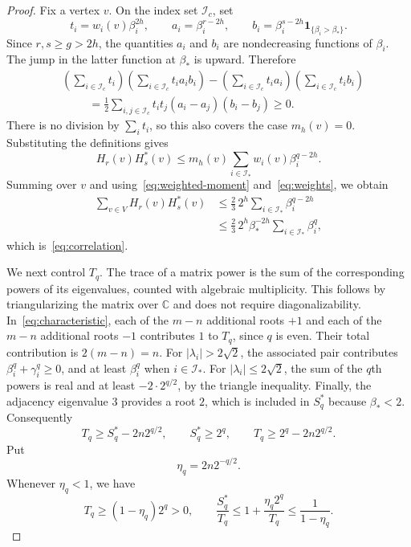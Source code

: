 \documentclass[11pt,a4paper]{article}
\newcommand{\ind}{\mathbf{1}}
\newcommand{\Ic}{\mathcal I_c}
\newcommand{\Is}{\mathcal I_*}
\begin{document}
\begin{proof}
Fix a vertex $v$. On the index set $\Ic$, set
\[
 t_i=w_i(v)\beta_i^{2h},\qquad
 a_i=\beta_i^{r-2h},\qquad
 b_i=\beta_i^{s-2h}\ind_{\{\beta_i>\beta_*\}}.
\]
Since $r,s\ge g>2h$, the quantities $a_i$ and $b_i$ are nondecreasing
functions of $\beta_i$. The jump in the latter function at $\beta_*$
is upward. Therefore
\begin{align*}
 &\left(\sum_{i\in\Ic}t_i\right)
  \left(\sum_{i\in\Ic}t_i a_i b_i\right)
 -\left(\sum_{i\in\Ic}t_i a_i\right)
  \left(\sum_{i\in\Ic}t_i b_i\right)\\
 &\hspace{1cm}
 =\frac12\sum_{i,j\in\Ic}t_it_j(a_i-a_j)(b_i-b_j)
 \ge0.
\end{align*}
There is no division by $\sum_i t_i$, so this also covers the case
$m_h(v)=0$. Substituting the definitions gives
\[
 H_r(v)H_s^*(v)
 \le m_h(v)\sum_{i\in\Is}w_i(v)\beta_i^{q-2h}.
\]
Summing over $v$ and using~\eqref{eq:weighted-moment}
and~\eqref{eq:weights}, we obtain
\begin{align*}
 \sum_{v\in V}H_r(v)H_s^*(v)
 &\le\frac23\,2^h\sum_{i\in\Is}\beta_i^{q-2h}\\
 &\le\frac23\,2^h\beta_*^{-2h}
       \sum_{i\in\Is}\beta_i^q,
\end{align*}
which is~\eqref{eq:correlation}.

We next control $T_q$. The trace of a matrix power is the sum of the
corresponding powers of its eigenvalues, counted with algebraic
multiplicity. This follows by triangularizing the matrix over
$\mathbb C$ and does not require diagonalizability.
In~\eqref{eq:characteristic}, each of the $m-n$ additional roots $+1$
and each of the $m-n$ additional roots $-1$ contributes $1$ to $T_q$,
since $q$ is even. Their total contribution is $2(m-n)=n$.
For $|\lambda_i|>2\sqrt2$, the associated pair contributes
$\beta_i^q+\gamma_i^q\ge0$, and at least $\beta_i^q$ when $i\in\Is$.
For $|\lambda_i|\le2\sqrt2$, the sum of the $q$th powers is real
and at least $-2\cdot2^{q/2}$, by the triangle inequality.
Finally, the adjacency eigenvalue $3$ provides a root $2$, which is
included in $S_q^*$ because $\beta_*<2$. Consequently
\begin{equation}\label{eq:trace-bounds}
 T_q\ge S_q^*-2n2^{q/2},\qquad
 S_q^*\ge2^q,\qquad
 T_q\ge2^q-2n2^{q/2}.
\end{equation}
Put
\begin{equation}\label{eq:eta}
 \eta_q=2n2^{-q/2}.
\end{equation}
Whenever $\eta_q<1$, we have
\begin{equation}\label{eq:trace-ratios}
 T_q\ge(1-\eta_q)2^q>0,
 \qquad
 \frac{S_q^*}{T_q}
 \le 1+\frac{\eta_q2^q}{T_q}
 \le\frac1{1-\eta_q}.
\end{equation}


\end{proof}
\end{document}
